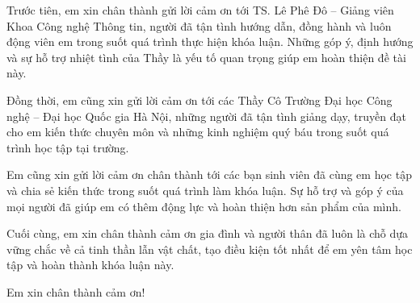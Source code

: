 
Trước tiên, em xin chân thành gửi lời cảm ơn tới TS. Lê Phê Đô – Giảng viên Khoa Công nghệ Thông tin, người đã tận tình hướng dẫn, đồng hành và luôn động viên em trong suốt quá trình thực hiện khóa luận. Những góp ý, định hướng và sự hỗ trợ nhiệt tình của Thầy là yếu tố quan trọng giúp em hoàn thiện đề tài này. 

Đồng thời, em cũng xin gửi lời cảm ơn tới các Thầy Cô Trường Đại học Công nghệ – Đại học Quốc gia Hà Nội, những người đã tận tình giảng dạy, truyền đạt cho em kiến 
thức chuyên môn và những kinh nghiệm quý báu trong suốt quá trình học tập tại trường. 

Em cũng xin gửi lời cảm ơn chân thành tới các bạn sinh viên đã cùng em học tập và chia sẻ kiến thức trong suốt quá trình làm khóa luận. Sự hỗ trợ và góp ý của mọi người đã giúp em có thêm động lực và hoàn thiện hơn sản phẩm của mình. 

Cuối cùng, em xin chân thành cảm ơn gia đình và người thân đã luôn là chỗ dựa vững chắc về cả tinh thần lẫn vật chất, tạo điều kiện tốt nhất để em yên tâm học tập và hoàn thành khóa luận này. 

Em xin chân thành cảm ơn!